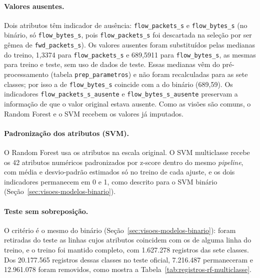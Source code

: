 \documentclass[
    12pt,                %
    openright,           %
    oneside,             %
    a4paper,             %
    english,             %
    brazil               %
]{abntex2}
\begin{document}
\paragraph{Valores ausentes.}
Dois atributos têm indicador de ausência: \texttt{flow\_packets\_s} e \texttt{flow\_bytes\_s} (no binário, só \texttt{flow\_bytes\_s}, pois \texttt{flow\_packets\_s} foi descartada na seleção por ser gêmea de \texttt{fwd\_packets\_s}). Os valores ausentes foram substituídos pelas medianas do treino, 1,3374 para \texttt{flow\_packets\_s} e 689,5911 para \texttt{flow\_bytes\_s}, as mesmas para treino e teste, sem uso de dados de teste. Essas medianas vêm do pré-processamento (tabela \texttt{prep\_parametros}) e não foram recalculadas para as sete classes; por isso a de \texttt{flow\_bytes\_s} coincide com a do binário (689,59). Os indicadores \texttt{flow\_packets\_s\_ausente} e \texttt{flow\_bytes\_s\_ausente} preservam a informação de que o valor original estava ausente. Como as visões são comuns, o Random Forest e o SVM recebem os valores já imputados.

\paragraph{Padronização dos atributos (SVM).}
O Random Forest usa os atributos na escala original. O SVM multiclasse recebe os 42 atributos numéricos padronizados por z-score dentro do mesmo \textit{pipeline}, com média e desvio-padrão estimados só no treino de cada ajuste, e os dois indicadores permanecem em 0 e 1, como descrito para o SVM binário (Seção~\ref{sec:visoes-modelos-binario}).

\paragraph{Teste sem sobreposição.}
O critério é o mesmo do binário (Seção~\ref{sec:visoes-modelos-binario}): foram retiradas do teste as linhas cujos atributos coincidem com os de alguma linha do treino, e o treino foi mantido completo, com 1.627.278 registros das sete classes. Dos 20.177.565 registros dessas classes no teste oficial, 7.216.487 permaneceram e 12.961.078 foram removidos, como mostra a Tabela~\ref{tab:registros-rf-multiclasse}.
\end{document}
